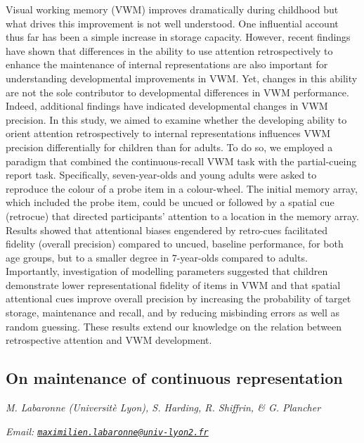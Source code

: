 \documentclass[12pt,]{book}
\begin{document}
Visual working memory (VWM) improves dramatically during childhood but what drives this improvement is not well understood. One influential account thus far has been a simple increase in storage capacity. However, recent findings have shown that differences in the ability to use attention retrospectively to enhance the maintenance of internal representations are also important for understanding developmental improvements in VWM. Yet, changes in this ability are not the sole contributor to developmental differences in VWM performance. Indeed, additional findings have indicated developmental changes in VWM precision. In this study, we aimed to examine whether the developing ability to orient attention retrospectively to internal representations influences VWM precision differentially for children than for adults. To do so, we employed a paradigm that combined the continuous-recall VWM task with the partial-cueing report task. Specifically, seven-year-olds and young adults were asked to reproduce the colour of a probe item in a colour-wheel. The initial memory array, which included the probe item, could be uncued or followed by a spatial cue (retrocue) that directed participants' attention to a location in the memory array. Results showed that attentional biases engendered by retro-cues facilitated fidelity (overall precision) compared to uncued, baseline performance, for both age groups, but to a smaller degree in 7-year-olds compared to adults. Importantly, investigation of modelling parameters suggested that children demonstrate lower representational fidelity of items in VWM and that spatial attentional cues improve overall precision by increasing the probability of target storage, maintenance and recall, and by reducing misbinding errors as well as random guessing. These results extend our knowledge on the relation between retrospective attention and VWM development.

\hypertarget{on-maintenance-of-continuous-representation}{%
\subsection{On maintenance of continuous representation}\label{on-maintenance-of-continuous-representation}}

\emph{M. Labaronne (Universitè Lyon), S. Harding, R. Shiffrin, \& G. Plancher}

\emph{Email: \href{mailto:maximilien.labaronne@univ-lyon2.fr}{\nolinkurl{maximilien.labaronne@univ-lyon2.fr}}}
\end{document}
